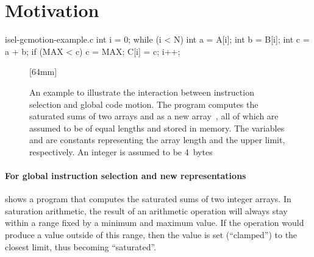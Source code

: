 \section{Motivation}

\begin{filecontents*}{isel-gcmotion-example.c}
int i = 0;
while (i < N) {
  int a = A[i];
  int b = B[i];
  int c = a + b;
  if (MAX < c) c = MAX;
  C[i] = c;
  i++;
}
\end{filecontents*}

\begin{figure}
  \centering%
                {}%
  \hspace{5mm}%
                [64mm]%
                {}%

  \caption[%
            Example illustrating the interaction between instruction selection
            and global code motion%
          ]{%
            An example to illustrate the interaction between instruction
            selection and global code motion.
            The program computes the saturated sums of two arrays  and
             as a new array~, all of which are assumed to be
            of equal lengths and stored in memory.
            The variables  and  are constants representing
            the array length and the upper limit, respectively.
            An integer is assumed to be 4~bytes%
          }
\end{figure}

\paragraph{For global instruction selection and new representations}

 shows a program that computes the saturated
sums of two integer arrays.
%
In saturation arithmetic, the result of an arithmetic \gls{operation} will
always stay within a range fixed by a minimum and maximum value.
%
If the \gls{operation} would produce a value outside of this range, then the
value is set (``clamped'') to the closest limit, thus becoming ``saturated''.

